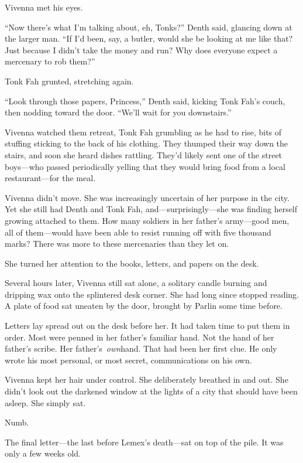 Vivenna met his eyes.

“Now there’s what I’m talking about, eh, Tonks?” Denth said, glancing down at the larger man. “If I’d been, say, a butler, would she be looking at me like that? Just because I didn’t take the money and run? Why does everyone expect a mercenary to rob them?”

Tonk Fah grunted, stretching again.

“Look through those papers, Princess,” Denth said, kicking Tonk Fah’s couch, then nodding toward the door. “We’ll wait for you downstairs.”

Vivenna watched them retreat, Tonk Fah grumbling as he had to rise, bits of stuffing sticking to the back of his clothing. They thumped their way down the stairs, and soon she heard dishes rattling. They’d likely sent one of the street boys—who passed periodically yelling that they would bring food from a local restaurant—for the meal.

Vivenna didn’t move. She was increasingly uncertain of her purpose in the city. Yet she still had Denth and Tonk Fah, and—surprisingly—she was finding herself growing attached to them. How many soldiers in her father’s army—good men, all of them—would have been able to resist running off with five thousand marks? There was more to these mercenaries than they let on.

She turned her attention to the books, letters, and papers on the desk.

\orn

Several hours later, Vivenna still sat alone, a solitary candle burning and dripping wax onto the splintered desk corner. She had long since stopped reading. A plate of food sat uneaten by the door, brought by Parlin some time before.

Letters lay spread out on the desk before her. It had taken time to put them in order. Most were penned in her father’s familiar hand. Not the hand of her father’s scribe. Her father’s~\textit{own}hand. That had been her first clue. He only wrote his most personal, or most secret, communications on his own.

Vivenna kept her hair under control. She deliberately breathed in and out. She didn’t look out the darkened window at the lights of a city that should have been asleep. She simply sat.

Numb.

The final letter—the last before Lemex’s death—sat on top of the pile. It was only a few weeks old.


